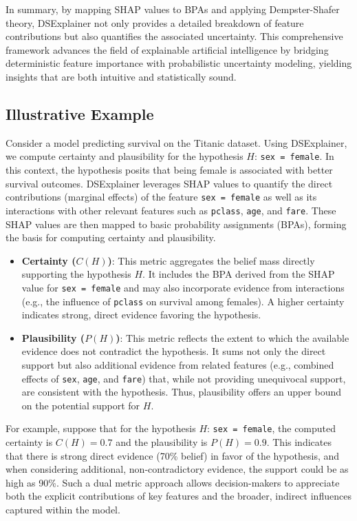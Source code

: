 \documentclass[acmlarge]{acmart}
\begin{document}
In summary, by mapping SHAP values to BPAs and applying Dempster-Shafer theory, DSExplainer not only provides a detailed breakdown of feature contributions but also quantifies the associated uncertainty. This comprehensive framework advances the field of explainable artificial intelligence by bridging deterministic feature importance with probabilistic uncertainty modeling, yielding insights that are both intuitive and statistically sound.


\subsection{Illustrative Example}

Consider a model predicting survival on the Titanic dataset. Using DSExplainer, we compute certainty and plausibility for the hypothesis \( H \): \texttt{sex = female}. In this context, the hypothesis posits that being female is associated with better survival outcomes. DSExplainer leverages SHAP values to quantify the direct contributions (marginal effects) of the feature \texttt{sex = female} as well as its interactions with other relevant features such as \texttt{pclass}, \texttt{age}, and \texttt{fare}. These SHAP values are then mapped to basic probability assignments (BPAs), forming the basis for computing certainty and plausibility.

\begin{itemize}
    \item \textbf{Certainty (\( C(H) \))}: This metric aggregates the belief mass directly supporting the hypothesis \( H \). It includes the BPA derived from the SHAP value for \texttt{sex = female} and may also incorporate evidence from interactions (e.g., the influence of \texttt{pclass} on survival among females). A higher certainty indicates strong, direct evidence favoring the hypothesis.
    \item \textbf{Plausibility (\( P(H) \))}: This metric reflects the extent to which the available evidence does not contradict the hypothesis. It sums not only the direct support but also additional evidence from related features (e.g., combined effects of \texttt{sex}, \texttt{age}, and \texttt{fare}) that, while not providing unequivocal support, are consistent with the hypothesis. Thus, plausibility offers an upper bound on the potential support for \( H \).
\end{itemize}

For example, suppose that for the hypothesis \( H \): \texttt{sex = female}, the computed certainty is \( C(H) = 0.7 \) and the plausibility is \( P(H) = 0.9 \). This indicates that there is strong direct evidence (70\% belief) in favor of the hypothesis, and when considering additional, non-contradictory evidence, the support could be as high as 90\%. Such a dual metric approach allows decision-makers to appreciate both the explicit contributions of key features and the broader, indirect influences captured within the model.
\end{document}
